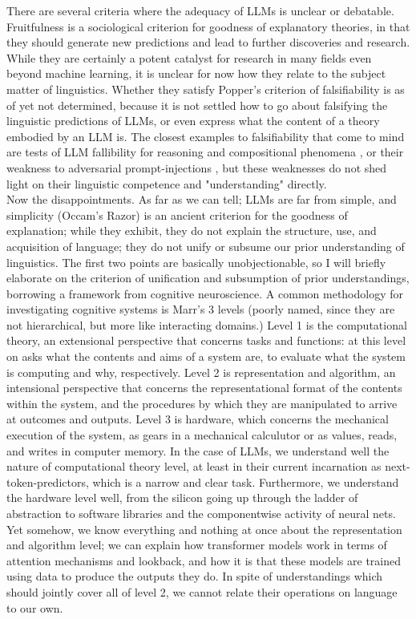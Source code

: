 There are several criteria where the adequacy of LLMs is unclear or debatable. Fruitfulness is a sociological criterion for goodness of explanatory theories, in that they should generate new predictions and lead to further discoveries and research. While they are certainly a potent catalyst for research in many fields even beyond machine learning, it is unclear for now how they relate to the subject matter of linguistics. Whether they satisfy Popper's criterion of falsifiability is as of yet not determined, because it is not settled how to go about falsifying the linguistic predictions of LLMs, or even express what the content of a theory embodied by an LLM is. The closest examples to falsifiability that come to mind are tests of LLM fallibility for reasoning and compositional phenomena \citep{dziri_faith_2023}, or their weakness to adversarial prompt-injections \citep{noauthor_riley_2022}, but these weaknesses do not shed light on their linguistic competence and "understanding" directly.\\

Now the disappointments. As far as we can tell; LLMs are far from simple, and simplicity (Occam's Razor) is an ancient criterion for the goodness of explanation; while they exhibit, they do not explain the structure, use, and acquisition of language; they do not unify or subsume our prior understanding of linguistics. The first two points are basically unobjectionable, so I will briefly elaborate on the criterion of unification and subsumption of prior understandings, borrowing a framework from cognitive neuroscience. A common methodology for investigating cognitive systems is Marr's 3 levels \citep{marr_vision_2010} (poorly named, since they are not hierarchical, but more like interacting domains.) Level 1 is the computational theory, an extensional perspective that concerns tasks and functions: at this level on asks what the contents and aims of a system are, to evaluate what the system is computing and why, respectively. Level 2 is representation and algorithm, an intensional perspective that concerns the representational format of the contents within the system, and the procedures by which they are manipulated to arrive at outcomes and outputs. Level 3 is hardware, which concerns the mechanical execution of the system, as gears in a mechanical calculutor or as values, reads, and writes in computer memory. In the case of LLMs, we understand well the nature of computational theory level, at least in their current incarnation as next-token-predictors, which is a narrow and clear task. Furthermore, we understand the hardware level well, from the silicon going up through the ladder of abstraction to software libraries and the componentwise activity of neural nets. Yet somehow, we know everything and nothing at once about the representation and algorithm level; we can explain how transformer models work in terms of attention mechanisms and lookback, and how it is that these models are trained using data to produce the outputs they do. In spite of understandings which should jointly cover all of level 2, we cannot relate their operations on language to our own.

